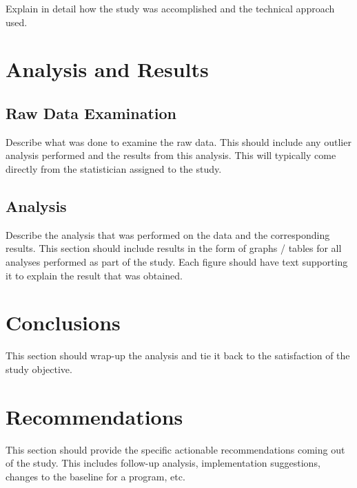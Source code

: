 Explain in detail how the study was accomplished and the
technical approach used.

\chapter{Analysis and Results}
\label{sec:AnalysisandResults}

\section{Raw Data Examination}
\label{sec:RawDataExamination}

Describe what was done to examine the raw data.  This should
include any outlier analysis performed and the results from this
analysis.  This will typically come directly from the statistician
assigned to the study.

\section{Analysis}
\label{sec:Analysis}

Describe the analysis that was performed on the data and the
corresponding results.  This section should include results in the
form of graphs / tables for all analyses performed as part of the
study.  Each figure should have text supporting it to explain the
result that was obtained.


\chapter{Conclusions}
\label{sec:Conclusions}

This section should wrap-up the analysis and tie it back to the
satisfaction of the study objective.

\chapter{Recommendations}
\label{sec:Recommendations}


This section should provide the specific actionable
recommendations coming out of the study.  This includes follow-up
analysis, implementation suggestions, changes to the baseline for a
program, etc.

